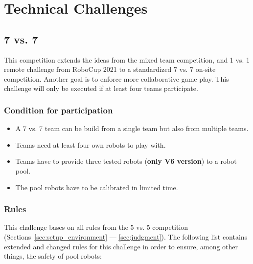 \section{Technical Challenges}

\subsection{7 vs. 7}
    This competition extends the ideas from the mixed team competition, and 1 vs. 1 remote challenge from RoboCup 2021 to a standardized 7 vs. 7 on-site competition. Another goal is to enforce more collaborative game play. This challenge will only be executed if at least four teams participate.

    \subsubsection{Condition for participation} %
    \label{sec:7vs7:condition_for_participation}
        \begin{itemize}
            \item A 7 vs. 7 team can be build from a single team but also from multiple teams.
            \item Teams need at least four own robots to play with.
            \item Teams have to provide three tested robots (\textbf{only V6 version}) to a robot pool.
            \item The pool robots have to be calibrated in limited time.
        \end{itemize}

    \subsubsection{Rules}
        This challenge bases on all rules from the 5 vs. 5 competition (Sections~\ref{sec:setup_environment} — \ref{sec:judgment}). The following list contains extended and changed rules for this challenge in order to ensure, among other things, the safety of pool robots:

